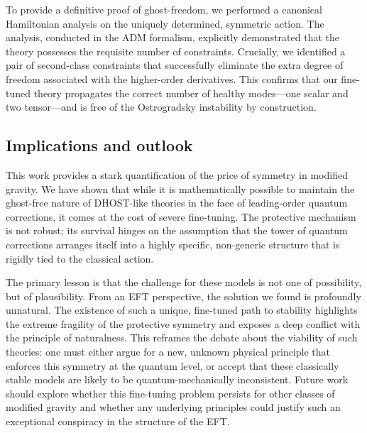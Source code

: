 \documentclass[twocolumn]{aastex631}
\begin{document}
To provide a definitive proof of ghost-freedom, we performed a canonical Hamiltonian analysis on the uniquely determined, symmetric action. The analysis, conducted in the ADM formalism, explicitly demonstrated that the theory possesses the requisite number of constraints. Crucially, we identified a pair of second-class constraints that successfully eliminate the extra degree of freedom associated with the higher-order derivatives. This confirms that our fine-tuned theory propagates the correct number of healthy modes---one scalar and two tensor---and is free of the Ostrogradsky instability by construction.

\subsection{Implications and outlook}
This work provides a stark quantification of the price of symmetry in modified gravity. We have shown that while it is mathematically possible to maintain the ghost-free nature of DHOST-like theories in the face of leading-order quantum corrections, it comes at the cost of severe fine-tuning. The protective mechanism is not robust; its survival hinges on the assumption that the tower of quantum corrections arranges itself into a highly specific, non-generic structure that is rigidly tied to the classical action.

The primary lesson is that the challenge for these models is not one of possibility, but of plausibility. From an EFT perspective, the solution we found is profoundly unnatural. The existence of such a unique, fine-tuned path to stability highlights the extreme fragility of the protective symmetry and exposes a deep conflict with the principle of naturalness. This reframes the debate about the viability of such theories: one must either argue for a new, unknown physical principle that enforces this symmetry at the quantum level, or accept that these classically stable models are likely to be quantum-mechanically inconsistent. Future work should explore whether this fine-tuning problem persists for other classes of modified gravity and whether any underlying principles could justify such an exceptional conspiracy in the structure of the EFT.
\end{document}

